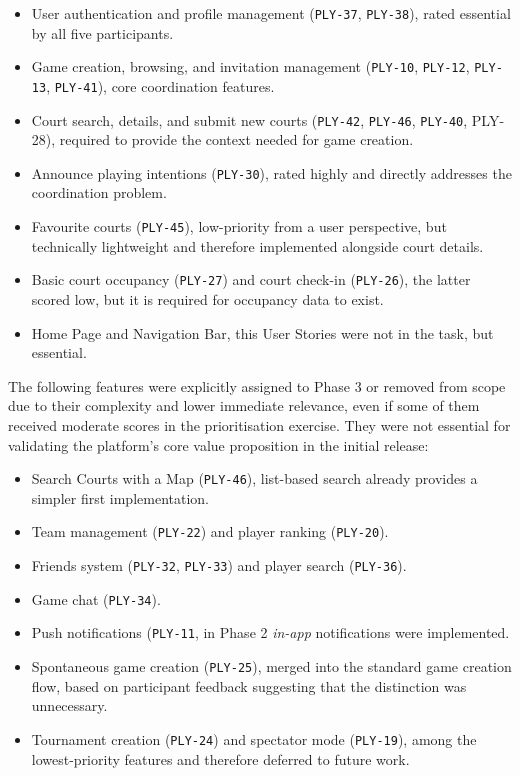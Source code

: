 \begin{itemize}
	\item User authentication and profile management (\texttt{PLY-37}, \texttt{PLY-38}), rated essential by all five participants.
	\item Game creation, browsing, and invitation management (\texttt{PLY-10}, \texttt{PLY-12}, \texttt{PLY-13}, \texttt{PLY-41}), core coordination features.
	\item Court search, details, and submit new courts (\texttt{PLY-42}, \texttt{PLY-46}, \texttt{PLY-40}, PLY-28), required to provide the context needed for game creation.
	\item Announce playing intentions (\texttt{PLY-30}), rated highly and directly addresses the coordination problem.
	\item Favourite courts (\texttt{PLY-45}), low-priority from a user perspective, but technically lightweight and therefore implemented alongside court details.
	\item Basic court occupancy (\texttt{PLY-27}) and court check-in (\texttt{PLY-26}), the latter scored low, but it is required for occupancy data to exist.
	\item Home Page and Navigation Bar, this User Stories were not in the task, but essential.
\end{itemize}

The following features were explicitly assigned to Phase 3 or removed from scope due to their complexity and lower immediate relevance, even if some of them received moderate scores in the prioritisation exercise. They were not essential for validating the platform’s core value proposition in the initial release:

\begin{itemize}
	\item Search Courts with a Map (\texttt{PLY-46}),  list-based search already provides a simpler first implementation.
	\item Team management (\texttt{PLY-22}) and player ranking (\texttt{PLY-20}).
	\item Friends system (\texttt{PLY-32}, \texttt{PLY-33}) and player search (\texttt{PLY-36}).
	\item Game chat (\texttt{PLY-34}).
	\item Push notifications (\texttt{PLY-11}, in Phase 2 \textit{in-app} notifications were implemented.
	\item Spontaneous game creation (\texttt{PLY-25}), merged into the standard game creation flow, based on participant feedback suggesting that the distinction was unnecessary.
	\item Tournament creation (\texttt{PLY-24}) and spectator mode (\texttt{PLY-19}), among the lowest-priority features and therefore deferred to future work.
\end{itemize}

